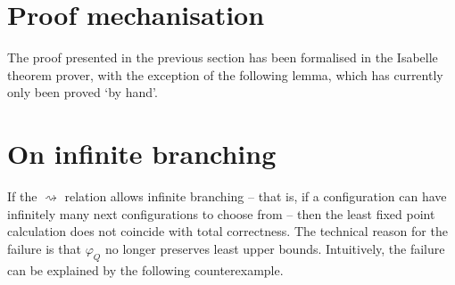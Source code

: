 \documentclass{llncs}
\newcommand\trans{\rightsquigarrow}
\newcommand\SafeOne{\varphi}
\begin{document}
\section{Proof mechanisation}
\label{sec:isabelle}

The proof presented in the previous section has been formalised in the
Isabelle theorem prover, with the exception of the following lemma,
which has currently only been proved `by hand'. 


\section{On infinite branching}
\label{sec:infinite_branching}

If the $\trans$ relation allows infinite branching -- that is, if a
configuration can have infinitely many next configurations to choose
from -- then the least fixed point calculation does not coincide with
total correctness. The technical reason for the failure is that
$\SafeOne_Q$ no longer preserves least upper bounds. Intuitively, the
failure can be explained by the following counterexample.
\end{document}
